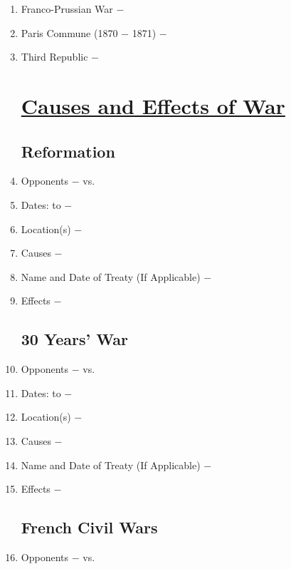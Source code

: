 \documentclass[12pt]{article}
\begin{document}
\begin{enumerate}
\item Franco-Prussian War $-$

\item Paris Commune (1870 $-$ 1871) $-$ 

\item Third Republic $-$


\section{\underline{Causes and Effects of War}}

\subsection{Reformation} 

\item Opponents $-$ vs.

\item Dates: to $-$

\item Location(s) $-$ 

\item Causes $-$

\item Name and Date of Treaty (If Applicable) $-$ 

\item Effects $-$ 

\subsection{30 Years' War}

\item Opponents $-$ vs.

\item Dates: to $-$

\item Location(s) $-$ 

\item Causes $-$

\item Name and Date of Treaty (If Applicable) $-$ 

\item Effects $-$

\subsection{French Civil Wars}
 
\item Opponents $-$ vs.


\end{enumerate}
\end{document}
